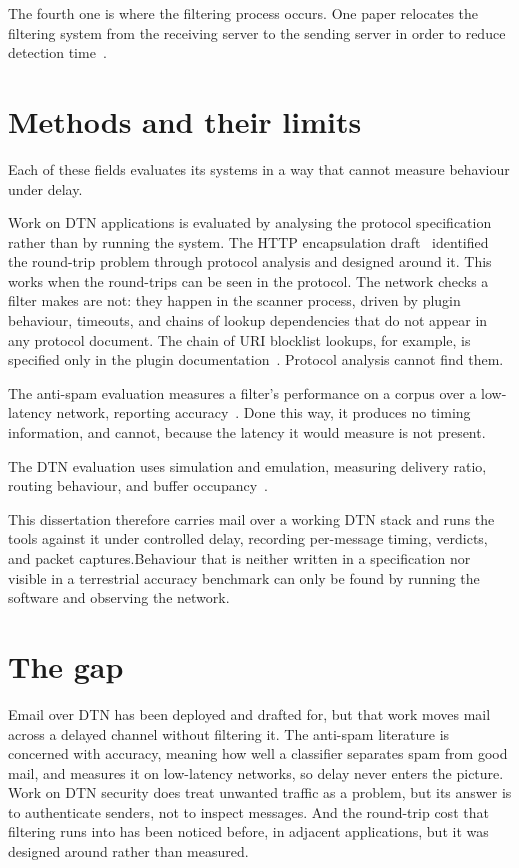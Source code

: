 The fourth one is where the filtering process occurs. One paper relocates the filtering system from the receiving server to the sending server in order to reduce detection time~\cite{pour-relocating}.

\section{Methods and their limits}

Each of these fields evaluates its systems in a way that cannot measure behaviour under delay.

Work on DTN applications is evaluated by analysing the protocol specification rather than by running the system. The HTTP encapsulation draft~\cite{blanchet-dtn-http-over-bp-04} identified the round-trip problem through protocol analysis and designed around it. This works when the round-trips can be seen in the protocol. The network checks a filter makes are not: they happen in the scanner process, driven by plugin behaviour, timeouts, and chains of lookup dependencies that do not appear in any protocol document. The chain of URI blocklist lookups, for example, is specified only in the plugin documentation~\cite{sauridnsbl}. Protocol analysis cannot find them.

The anti-spam evaluation measures a filter's performance on a corpus over a low-latency network, reporting accuracy~\cite{dada-mlspam,damiani-digest}. Done this way, it produces no timing information, and cannot, because the latency it would measure is not present.

The DTN evaluation uses simulation and emulation, measuring delivery ratio, routing behaviour, and buffer occupancy~\cite{jain-dtn-routing}.

This dissertation therefore carries mail over a working DTN stack and runs the tools against it under controlled delay, recording per-message timing, verdicts, and packet captures.Behaviour that is neither written in a specification nor visible in a terrestrial accuracy benchmark can only be found by running the software and observing the network.

\section{The gap}

Email over DTN has been deployed and drafted for, but that work moves mail across a delayed channel without filtering it. The anti-spam literature is concerned with accuracy, meaning how well a classifier separates spam from good mail, and measures it on low-latency networks, so delay never enters the picture. Work on DTN security does treat unwanted traffic as a problem, but its answer is to authenticate senders, not to inspect messages. And the round-trip cost that filtering runs into has been noticed before, in adjacent applications, but it was designed around rather than measured.

